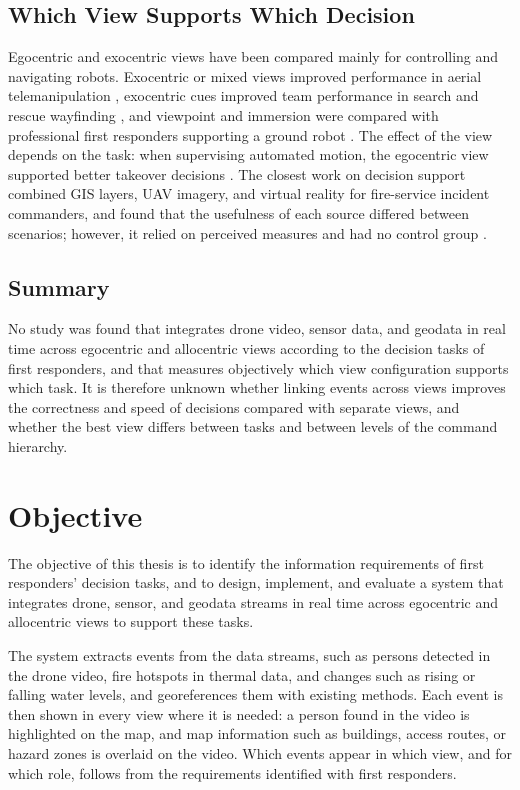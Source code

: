 \documentclass{article}
\begin{document}
\subsection{Which View Supports Which Decision}
Egocentric and exocentric views have been compared mainly for controlling and navigating robots.
Exocentric or mixed views improved performance in aerial telemanipulation \cite{young2021interface}, exocentric cues improved team performance in search and rescue wayfinding \cite{xu2024arsar}, and viewpoint and immersion were compared with professional first responders supporting a ground robot \cite{pretolesi2025hri}.
The effect of the view depends on the task: when supervising automated motion, the egocentric view supported better takeover decisions \cite{larson2026viewpoint}.
The closest work on decision support combined GIS layers, UAV imagery, and virtual reality for fire-service incident commanders, and found that the usefulness of each source differed between scenarios; however, it relied on perceived measures and had no control group \cite{hancko2026c2}.

\subsection{Summary}
No study was found that integrates drone video, sensor data, and geodata in real time across egocentric and allocentric views according to the decision tasks of first responders, and that measures objectively which view configuration supports which task.
It is therefore unknown whether linking events across views improves the correctness and speed of decisions compared with separate views, and whether the best view differs between tasks and between levels of the command hierarchy.

\section{Objective}
The objective of this thesis is to identify the information requirements of first responders' decision tasks, and to design, implement, and evaluate a system that integrates drone, sensor, and geodata streams in real time across egocentric and allocentric views to support these tasks.

The system extracts events from the data streams, such as persons detected in the drone video, fire hotspots in thermal data, and changes such as rising or falling water levels, and georeferences them with existing methods.
Each event is then shown in every view where it is needed: a person found in the video is highlighted on the map, and map information such as buildings, access routes, or hazard zones is overlaid on the video.
Which events appear in which view, and for which role, follows from the requirements identified with first responders.
\end{document}
